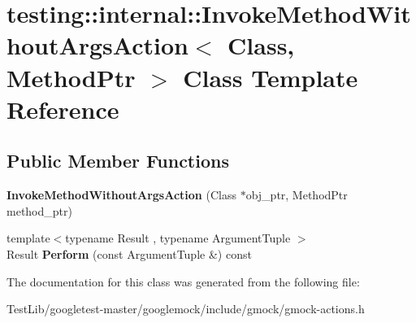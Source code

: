 \hypertarget{classtesting_1_1internal_1_1InvokeMethodWithoutArgsAction}{}\section{testing\+:\+:internal\+:\+:Invoke\+Method\+Without\+Args\+Action$<$ Class, Method\+Ptr $>$ Class Template Reference}
\label{classtesting_1_1internal_1_1InvokeMethodWithoutArgsAction}
\subsection*{Public Member Functions}
\begin{DoxyCompactItemize}
\item 
\mbox{\label{classtesting_1_1internal_1_1InvokeMethodWithoutArgsAction_ac4d655e386f47a96c7a6e1670b20e991}} 
{\bfseries Invoke\+Method\+Without\+Args\+Action} (Class $\ast$obj\+\_\+ptr, Method\+Ptr method\+\_\+ptr)
\item 
\mbox{\label{classtesting_1_1internal_1_1InvokeMethodWithoutArgsAction_a9915e4f7a064e00b7798216644670b52}} 
{\footnotesize template$<$typename Result , typename Argument\+Tuple $>$ }\\Result {\bfseries Perform} (const Argument\+Tuple \&) const
\end{DoxyCompactItemize}


The documentation for this class was generated from the following file\+:\begin{DoxyCompactItemize}
\item 
Test\+Lib/googletest-\/master/googlemock/include/gmock/gmock-\/actions.\+h\end{DoxyCompactItemize}
